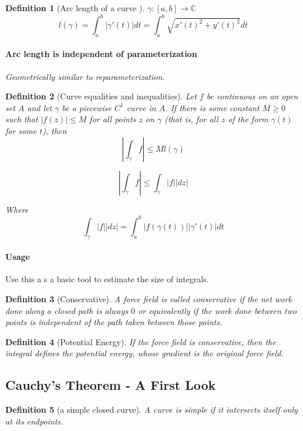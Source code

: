 \documentclass[a4paper]{article}
\newtheorem{definition}{Definition}
\newcommand{\C}{\mathbb{C}}
\begin{document}
\begin{definition}[Arc length of a curve ]
  \(\gamma : [a, b] \to \C\)
  \[
    l(\gamma) = \int_a^b|\gamma'(t)| dt = \int^b_a \sqrt{x'(t)^2 + y'(t)^2}dt
  \]

  \paragraph{Arc length is independent of parameterization}
  Geometrically similar to reparameterization. 

\end{definition}


\begin{definition}[Curve equalities and inequalities]
  Let $f$ be continuous on an open set $A$ and let $\gamma$ be a piecewise $C^1$ curve in $A$. If there is some constant $M \geq 0$ such that $|f(z)| \leq M$ for all points $z$ on $\gamma$ (that is, for all $z$ of the form $\gamma(t)$ for some $t$), then
  \[
    |\int_\gamma f| \leq M l(\gamma)
  \]

  \[
    |\int_\gamma f| \leq \int_\gamma |f| |dz|
  \]

  Where
  \[
    \int_\gamma |f| |dz| = \int_a^b |f(\gamma(t))|| \gamma'(t)| dt
  \]
\end{definition}
\paragraph{Usage}
Use this a s a basic tool to estimate the size of integrals. 






\begin{definition}[Conservative]
  A force field is called conservative if the net work done along a closed path is always $0$ or equivalently if the work done between two points is independent of the path taken between those points. 
\end{definition}

\begin{definition}[Potential Energy]
  If the force field is conservative, then the integral defines the potential energy, whose gradient is the original force field. 
\end{definition}

\subsection{Cauchy's Theorem - A First Look}
\begin{definition}[a simple closed curve]
  A curve is simple if it intersects itself only at its endpoints. 
\end{definition}
\end{document}
